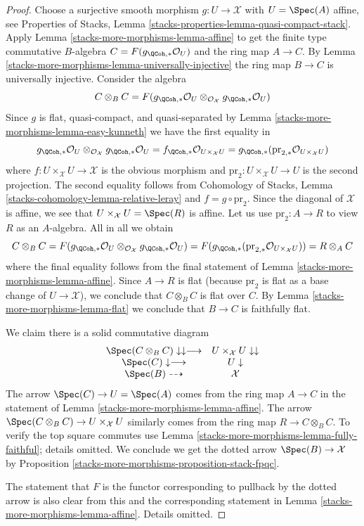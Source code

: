\begin{proof}
Choose a surjective smooth morphism $g : U \to \mathcal{X}$ with $U = \Spec(A)$
affine, see Properties of Stacks, Lemma
\ref{stacks-properties-lemma-quasi-compact-stack}. Apply
Lemma \ref{stacks-more-morphisms-lemma-affine} to get the finite type
commutative $B$-algebra $C = F(g_{\QCoh, *}\mathcal{O}_U)$
and the ring map $A \to C$.
By Lemma \ref{stacks-more-morphisms-lemma-universally-injective}
the ring map $B \to C$ is universally injective.
Consider the algebra
$$
C \otimes_B C =
F(g_{\QCoh, *}\mathcal{O}_U
\otimes_{\mathcal{O}_\mathcal{X}}
g_{\QCoh, *}\mathcal{O}_U)
$$
Since $g$ is flat, quasi-compact, and quasi-separated
by Lemma \ref{stacks-more-morphisms-lemma-easy-kunneth} we have the first equality in
$$
g_{\QCoh, *}\mathcal{O}_U
\otimes_{\mathcal{O}_\mathcal{X}}
g_{\QCoh, *}\mathcal{O}_U
=
f_{\QCoh, *}\mathcal{O}_{U \times_\mathcal{X} U} =
g_{\QCoh, *}(\text{pr}_{2, *}\mathcal{O}_{U \times_\mathcal{X} U})
$$
where
$f : U \times_\mathcal{X} U \to \mathcal{X}$ is the obvious morphism
and $\text{pr}_2 : U \times_\mathcal{X} U \to U$ is the second
projection. The second equality follows from
Cohomology of Stacks, Lemma \ref{stacks-cohomology-lemma-relative-leray}
and $f = g \circ \text{pr}_2$. Since the diagonal of $\mathcal{X}$
is affine, we see that $U \times_\mathcal{X} U = \Spec(R)$ is affine.
Let us use $\text{pr}_2 : A \to R$ to view $R$ as an $A$-algebra.
All in all we obtain
$$
C \otimes_B C =
F(g_{\QCoh, *}\mathcal{O}_U
\otimes_{\mathcal{O}_\mathcal{X}}
g_{\QCoh, *}\mathcal{O}_U) =
F(g_{\QCoh, *}(\text{pr}_{2, *}\mathcal{O}_{U \times_\mathcal{X} U})) =
R \otimes_A C
$$
where the final equality follows from the final statement of
Lemma \ref{stacks-more-morphisms-lemma-affine}. Since $A \to R$ is flat (because
$\text{pr}_2$ is flat as a base change of $U \to \mathcal{X}$),
we conclude that $C \otimes_B C$ is flat over $C$.
By Lemma \ref{stacks-more-morphisms-lemma-flat} we conclude that $B \to C$ is faithfully flat.

\medskip\noindent
We claim there is a solid commutative diagram
$$
\begin{array}{cc}\Spec(C \otimes_B C) \downarrow\downarrow\longrightarrow & U \times_\mathcal{X} U \downarrow\downarrow \\ \Spec(C) \downarrow\longrightarrow & U \downarrow \\ \Spec(B) \dashrightarrow & \mathcal{X}\end{array}
$$
The arrow $\Spec(C) \to U = \Spec(A)$ comes from the ring map
$A \to C$ in the statement of Lemma \ref{stacks-more-morphisms-lemma-affine}.
The arrow $\Spec(C \otimes_B C) \to U \times_\mathcal{X} U$
similarly comes from the ring map $R \to C \otimes_B C$.
To verify the top square commutes use Lemma \ref{stacks-more-morphisms-lemma-fully-faithful};
details omitted.
We conclude we get the dotted arrow $\Spec(B) \to \mathcal{X}$
by Proposition \ref{stacks-more-morphisms-proposition-stack-fpqc}.

\medskip\noindent
The statement that $F$ is the functor corresponding to pullback
by the dotted arrow is also clear from this and the corresponding
statement in Lemma \ref{stacks-more-morphisms-lemma-affine}. Details omitted.
\end{proof}

